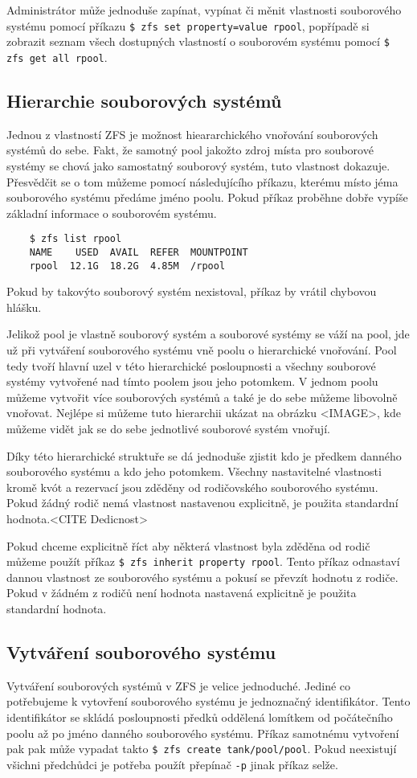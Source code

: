     Administrátor může jednoduše zapínat, vypínat či měnit vlastnosti souborového systému pomocí příkazu \verb|$ zfs set property=value rpool|, popřípadě si zobrazit seznam všech dostupných vlastností o souborovém systému pomocí \verb|$ zfs get all rpool|.

    \subsection{Hierarchie souborových systémů}
    \label{hiararchy}
    Jednou z vlastností ZFS je možnost hieararchického vnořování souborových systémů do sebe. Fakt, že samotný pool jakožto zdroj místa pro souborové systémy se chová jako samostatný souborový systém, tuto vlastnost dokazuje. Přesvědčit se o tom můžeme pomocí následujícího příkazu, kterému místo jéma souborového systému předáme jméno poolu. Pokud příkaz proběhne dobře vypíše základní informace o souborovém systému.
    \begin{verbatim}
    $ zfs list rpool
    NAME    USED  AVAIL  REFER  MOUNTPOINT
    rpool  12.1G  18.2G  4.85M  /rpool
    \end{verbatim}
    Pokud by takovýto souborový systém nexistoval, příkaz by vrátil chybovou hlášku.

    Jelikož pool je vlastně souborový systém a souborové systémy se váží na pool, jde už při vytváření souborového systému vně poolu o hierarchické vnořování. Pool tedy tvoří hlavní uzel v této hierarchické posloupnosti a všechny souborové systémy vytvořené nad tímto poolem jsou jeho potomkem. V jednom poolu můžeme vytvořit více souborových systémů a také je do sebe můžeme libovolně vnořovat. Nejlépe si můžeme tuto hierarchii ukázat na obrázku <IMAGE>, kde můžeme vidět jak se do sebe jednotlivé souborové systém vnořují.

    Díky této hierarchické struktuře se dá jednoduše zjistit kdo je předkem danného souborového systému a kdo jeho potomkem. Všechny nastavitelné vlastnosti kromě kvót a rezervací jsou zděděny od rodičovského souborového systému. Pokud žádný rodič nemá vlastnost nastavenou explicitně, je použita standardní hodnota.<CITE Dedicnost>

    Pokud chceme explicitně říct aby některá vlastnost byla zděděna od rodič můžeme použít příkaz \verb|$ zfs inherit property rpool|. Tento příkaz odnastaví dannou vlastnost ze souborového systému a pokusí se převzít hodnotu z rodiče. Pokud v žádném z rodičů není hodnota nastavená explicitně je použita standardní hodnota.
    \subsection{Vytváření souborového systému}
    \label{createfs}
    Vytváření souborových systémů v ZFS je velice jednoduché. Jediné co potřebujeme k vytovření souborového systému je jednoznačný identifikátor. Tento identifikátor se skládá posloupnosti předků oddělená lomítkem od počátečního poolu až po jméno danného souborového systému. Příkaz samotnému vytvoření pak pak může vypadat takto \verb|$ zfs create tank/pool/pool|. Pokud neexistují všichni předchůdci je potřeba použít přepínač \verb|-p| jinak příkaz selže.

